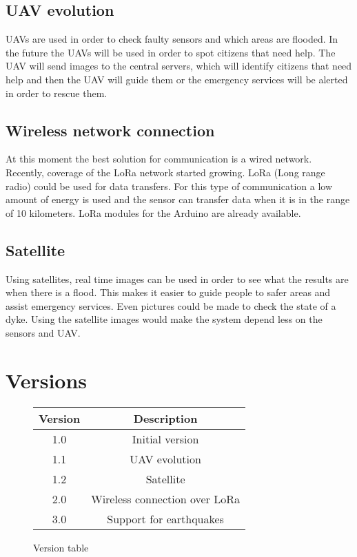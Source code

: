 \subsection{UAV evolution}
UAVs are used in order to check faulty sensors and which areas are flooded. In the future the UAVs will be used in order to spot citizens that need help. The UAV will send images to the central servers, which will identify citizens that need help and then the UAV will guide them or the emergency services will be alerted in order to rescue them. 

\subsection{Wireless network connection} 
At this moment the best solution for communication is a wired network. Recently, coverage of the LoRa network started growing. LoRa (Long range radio) could be used for data transfers. For this type of communication a low amount of energy is used and the sensor can transfer data when it is in the range of 10 kilometers.
LoRa modules for the Arduino are already available.

\subsection{Satellite}
Using satellites, real time images can be used in order to see what the results are when there is a flood. This makes it easier to guide people to safer areas and assist emergency services. Even pictures could be made to check the state of a dyke. Using the satellite images would make the system depend less on the sensors and UAV.

\section{Versions}
\label{sec:version}


\begin{figure}[H]
	\centering
	\begin{tabular}{|c|c|}
		\hline \textbf{Version} & \textbf{Description} \\ 
		\hline 1.0                 & Initial version                       \\ 
		\hline 1.1                 & UAV evolution                       \\ 
		\hline 1.2					& Satellite \\
		\hline 2.0                  & Wireless connection over LoRa                       \\ 
		\hline 3.0					& Support for earthquakes \\
		\hline
	\end{tabular} 
	\label{table:versions}
	\caption{Version table}
\end{figure}

